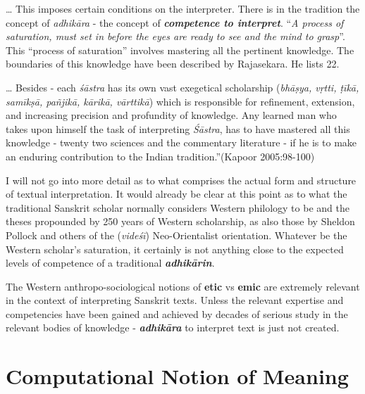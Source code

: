 \begin{myquote}
… This imposes certain conditions on the interpreter. There is in the tradition the concept of \textit{adhikāra} - the concept of \textbf{\textit{competence to interpret}}. “\textit{A process of saturation, must set in before the eyes are ready to see and the mind to grasp}”. This “process of saturation” involves mastering all the pertinent knowledge. The boundaries of this knowledge have been described by Rajasekara. He lists 22.
\end{myquote}

\begin{myquote}
… Besides - each \textit{śāstra} has its own vast exegetical scholarship (\textit{bhāṣya, vṛtti, ṭīkā, samīkṣā, pañjikā, kārikā, vārttikā}) which is responsible for refinement, extension, and increasing precision and profundity of knowledge. Any learned man who takes upon himself the task of interpreting \textit{Śāstra}, has to have mastered all this knowledge - twenty two sciences and the commentary literature - if he is to make an enduring contribution to the Indian tradition.”\hfill (Kapoor 2005:98-100)
\end{myquote}

I will not go into more detail as to what comprises the actual form and structure of textual interpretation. It would already be clear at this point as to what the traditional Sanskrit scholar normally considers Western philology to be and the theses propounded by 250 years of Western scholarship, as also those by Sheldon Pollock and others of the (\textit{videśī}) Neo-Orientalist orientation. Whatever be the Western scholar’s saturation, it certainly is not anything close to the expected levels of competence of a traditional \textbf{\textit{adhikārin}}.

The Western anthropo-sociological notions of \textbf{etic} vs \textbf{emic} are extremely relevant in the context of interpreting Sanskrit texts. Unless the relevant expertise and competencies have been gained and achieved by decades of serious study in the relevant bodies of knowledge - \textbf{\textit{adhikāra}} to interpret text is just not created.


\section*{Computational Notion of Meaning}

\vskip -6.5pt

